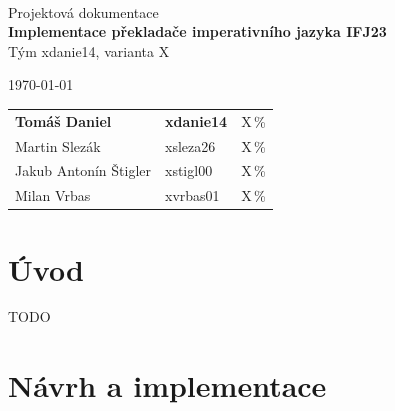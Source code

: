 \documentclass[a4paper, 11pt]{article} %
\begin{document}
	\begin{titlepage}
		\begin{center}
       \\
			\Huge{Projektová dokumentace} \\
			\LARGE{\textbf{Implementace překladače imperativního jazyka IFJ23}} \\
			\Large{Tým xdanie14, varianta X}
		\end{center}

    {\Large \today \hfill
    \Large
    \begin{tabular}{l l l}
      \textbf{Tomáš Daniel} & \quad \textbf{xdanie14} & \quad X\,\% \\
      Martin Slezák         & \quad xsleza26          & \quad X\,\% \\
      Jakub Antonín Štigler & \quad xstigl00          & \quad X\,\% \\
      Milan Vrbas           & \quad xvrbas01          & \quad X\,\% \\
    \end{tabular}
    }
  \end{titlepage}

  \tableofcontents
  \thispagestyle{empty}
  \newpage

  \setcounter{page}{1}
  \section{Úvod}
  TODO
  \section{Návrh a implementace}
  
\end{document}
